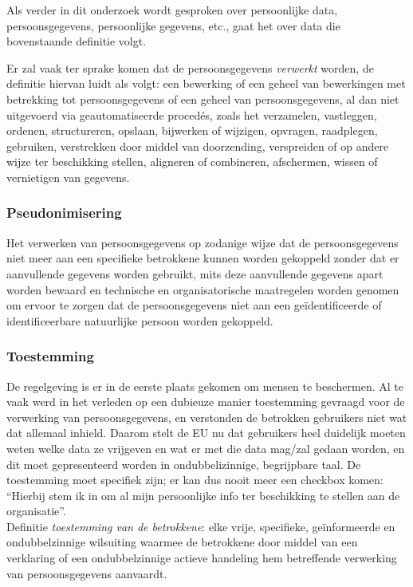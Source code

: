  Als verder in dit onderzoek wordt gesproken over persoonlijke data, persoonsgegevens, persoonlijke gegevens, etc., gaat het over data die bovenstaande definitie volgt. 

Er zal vaak ter sprake komen dat de persoonsgegevens \textit{verwerkt} worden, de definitie hiervan luidt als volgt: een bewerking of een geheel van bewerkingen met betrekking tot persoonsgegevens of een geheel van persoonsgegevens, al dan niet uitgevoerd via geautomatiseerde procedés, zoals het verzamelen, vastleggen, ordenen, structureren, opslaan, bijwerken of wijzigen, opvragen, raadplegen, gebruiken, verstrekken door middel van doorzending, verspreiden of op andere wijze ter beschikking stellen, aligneren of combineren, afschermen, wissen of vernietigen van gegevens.

\subsubsection{Pseudonimisering} 
Het verwerken van persoonsgegevens op zodanige wijze dat de persoonsgegevens niet meer aan een specifieke betrokkene kunnen worden gekoppeld zonder dat er aanvullende gegevens worden gebruikt, mits deze aanvullende gegevens apart worden bewaard en technische en organisatorische maatregelen worden genomen om ervoor te zorgen dat de persoonsgegevens niet aan een geïdentificeerde of identificeerbare natuurlijke persoon worden gekoppeld. 

\subsubsection{Toestemming} 
De regelgeving is er in de eerste plaats gekomen om mensen te beschermen. Al te vaak werd in het verleden op een dubieuze manier toestemming gevraagd voor de verwerking van persoonsgegevens, en verstonden de betrokken gebruikers niet wat dat allemaal inhield. Daarom stelt de EU nu dat gebruikers heel duidelijk moeten weten welke data ze vrijgeven en wat er met die data mag/zal gedaan worden, en dit moet gepresenteerd worden in ondubbelizinnige, begrijpbare taal.
De toestemming moet specifiek zijn; er kan dus nooit meer een checkbox komen: “Hierbij stem ik in om al mijn persoonlijke info ter beschikking te stellen aan de organisatie”.\\ Definitie \textit{toestemming van de betrokkene}: elke vrije, specifieke, geïnformeerde en ondubbelzinnige wilsuiting waarmee de betrokkene door middel van een verklaring of een ondubbelzinnige actieve handeling hem betreffende verwerking van persoonsgegevens aanvaardt. 


